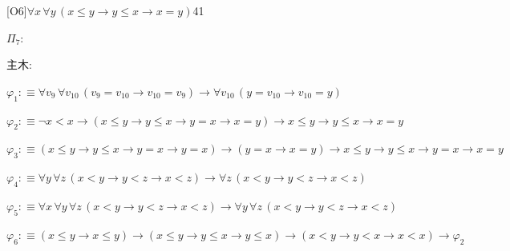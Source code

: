 \begin{fullproof}{[O6]}{$\forall x\,\forall y\,(x \leq y \to y \leq x \to x = y)$}{41}
\begin{ptree}
\end{ptree}
\noindent$\Pi_{7}$:
\begin{ptree}
\noLine
{}
\end{ptree}
\noindent 主木:
\begin{ptree}
\noLine
{}
\noLine
{}
\end{ptree}
\begin{abbrevlist}
\item $\varphi_{1} :\equiv \forall v_{9}\,\forall v_{10}\,(v_{9} = v_{10} \to v_{10} = v_{9}) \to \forall v_{10}\,(y = v_{10} \to v_{10} = y)$
\item $\varphi_{2} :\equiv \neg x < x \to (x \leq y \to y \leq x \to y = x \to x = y) \to x \leq y \to y \leq x \to x = y$
\item $\varphi_{3} :\equiv (x \leq y \to y \leq x \to y = x \to y = x) \to (y = x \to x = y) \to x \leq y \to y \leq x \to y = x \to x = y$
\item $\varphi_{4} :\equiv \forall y\,\forall z\,(x < y \to y < z \to x < z) \to \forall z\,(x < y \to y < z \to x < z)$
\item $\varphi_{5} :\equiv \forall x\,\forall y\,\forall z\,(x < y \to y < z \to x < z) \to \forall y\,\forall z\,(x < y \to y < z \to x < z)$
\item $\varphi_{6} :\equiv (x \leq y \to x \leq y) \to (x \leq y \to y \leq x \to y \leq x) \to (x < y \to y < x \to x < x) \to \varphi_{2}$
\end{abbrevlist}
\end{fullproof}

